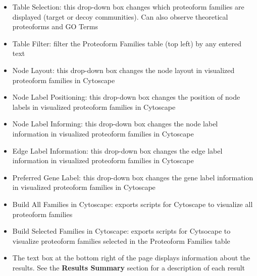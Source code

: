 \begin{itemize}
\begin{itemize}
\end{itemize}
\item Table Selection: this drop-down box changes which proteoform families are displayed (target or decoy communities). Can also observe theoretical proteoforms and GO Terms
\item Table Filter: filter the Proteoform Families table (top left) by any entered text
\item Node Layout: this drop-down box changes the node layout in visualized proteoform families in Cytoscape
\item Node Label Positioning: this drop-down box changes the position of node labels in visualized proteoform families in Cytoscape
\item Node Label Informing: this drop-down box changes the node label information in visualized proteoform families in Cytoscape
\item Edge Label Information: this drop-down box changes the edge label information in visualized proteoform families in Cytoscape
\item Preferred Gene Label: this drop-down box changes the gene label information in visualized proteoform families in Cytoscape
\item Build All Families in Cytoscape: exports scripts for Cytoscape to visualize all proteoform families
\item Build Selected Families in Cytoscape: exports scripts for Cytsocape to visualize proteoform families selected in the Proteoform Families table
\item The text box at the bottom right of the page displays information about the results. See the \textbf{Results Summary} section for a description of each result
\end{itemize}